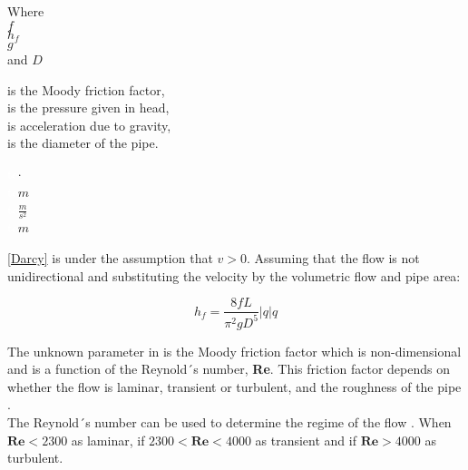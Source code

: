  \begin{minipage}[t]{0.20\textwidth}
Where\\
\hspace*{8mm} $f$ \\
\hspace*{8mm} $h_f$ \\
\hspace*{8mm} $g$ \\
and \hspace*{0.7mm} $D$ 
\end{minipage}
\begin{minipage}[t]{0.68\textwidth}
\vspace*{2mm}
is the Moody friction factor,\\ 
is the pressure given in head,\\ 
is acceleration due to gravity,\\
is the diameter of the pipe.
\end{minipage}
\begin{minipage}[t]{0.10\textwidth}
\vspace*{2mm}
\textcolor{White}{te}$\unit{\cdot}$\\
\textcolor{White}{te}$\unit{m}$\\
\textcolor{White}{te}$\unit{\frac{m}{s^2}}$\\
\textcolor{White}{te}$\unit{m}$
\end{minipage}

\eqref{Darcy} is under the assumption that $v>0$. %
 Assuming that the flow is not unidirectional and substituting the velocity by the volumetric flow and pipe area:

\begin{equation}
  h_f = \frac{8fL}{\pi^{2}gD^5} |q| q
  \label{DarcyWeisbach}
\end{equation} 
 
 The unknown parameter in  is the Moody friction factor 
 which is non-dimensional and is a function of the Reynold´s number, \textbf{Re}. This friction factor depends on whether the flow is laminar, transient or turbulent, and the roughness of the pipe \cite{Intro_Fluid}. \\
 
 
The Reynold´s number can be used to determine the regime of the flow \cite{Intro_Fluid}. When $\pmb{Re}<2300$ as laminar, if $2300<\pmb{Re}<4000$ as transient and if
$\pmb{Re}>4000$ as turbulent. 

